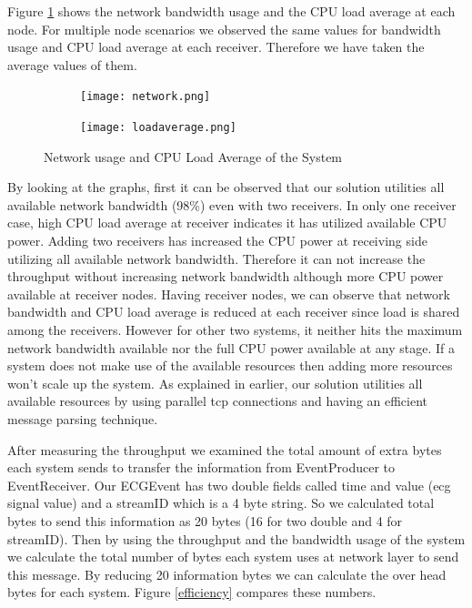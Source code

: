 Figure \ref{networkandload} shows the network bandwidth usage and the CPU load average at each node. For multiple node scenarios we observed the same values for bandwidth usage and CPU load average at each receiver. Therefore we have taken the average values of them. 

\begin{figure}
        \centering
        \begin{subfigure}[b]{0.45\textwidth}
                \texttt{[image: network.png]}
        \end{subfigure}
        \begin{subfigure}[b]{0.45\textwidth}
                \texttt{[image: loadaverage.png]}
        \end{subfigure}
        \caption{Network usage and CPU Load Average of the System}
        \label{networkandload}
\end{figure} 

By looking at the graphs, first it can be observed that our solution utilities all available network bandwidth (98\%) even with two receivers. In only one receiver case, high CPU load average at receiver indicates it has utilized available CPU power. Adding two receivers has increased the CPU power at receiving side utilizing all available network bandwidth. Therefore it can not increase the throughput without increasing network bandwidth although more CPU power available at receiver nodes. Having receiver nodes, we can observe that network bandwidth and CPU load average is reduced at each receiver since load is shared among the receivers. However for other two systems, it neither hits the maximum network bandwidth available nor the full CPU power available at any stage. If a system does not make use of the available resources then adding more resources won't scale up the system. As explained in earlier, our solution utilities all available resources by using parallel tcp connections and having an efficient message parsing technique.

After measuring the throughput we examined the  total amount of extra bytes each system sends to transfer the information from EventProducer to EventReceiver. Our ECGEvent has two double fields called time and value (ecg signal value) and a streamID which is a 4 byte string. So we calculated total bytes to send this information as 20 bytes (16 for two double and 4 for streamID). Then by using the throughput and the bandwidth usage of the system we calculate the total number of bytes each system uses at network layer to send this message. By reducing 20 information bytes we can calculate the over head bytes for each system. Figure \ref{efficiency} compares these numbers.

